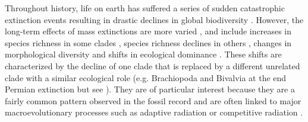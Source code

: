 \documentclass[12pt,letterpaper]{article}
\begin{document}
Throughout history, life on earth has suffered a series of sudden catastrophic extinction events resulting in drastic declines in global biodiversity \citep[e.g.][]{RaupPT,BentonPT,rennetime2013,Brusatte2015}. %
However, the long-term effects of mass extinctions are more varied \citep{Erwin1998344}, and include increases in species richness in some clades \citep{friedmanexplosive2010}, species richness declines in others \citep{Benton85}, changes in morphological diversity \citep{brusattedinosaur2012} and shifts in ecological dominance \citep[e.g.][]{Brusatte12092008,toljagictriassic-jurassic2013,bensonfaunal2014}.
These shifts are characterized by the decline of one clade that is replaced by a different unrelated clade with a similar ecological role \citep{Brusatte12092008} (e.g. Brachiopoda and Bivalvia at the end Permian extinction \citealt{Sepkiski1981,CLAPHAM01102006} but see \citealt{Payne22052014}). They are of particular interest because they are a fairly common pattern observed in the fossil record \citep[e.g.][]{D'Hondt01011996,Coxall01042006,thorneresetting2011,bensonfaunal2014} and are often linked to major macroevolutionary processes such as adaptive radiation \citep{Losos2010} or competitive radiation \citep{Brusatte12092008}.
\end{document}
